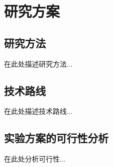 \section{研究方案}

\subsection{研究方法}
在此处描述研究方法...

\subsection{技术路线}
在此处描述技术路线...

\subsection{实验方案的可行性分析}
在此处分析可行性...

